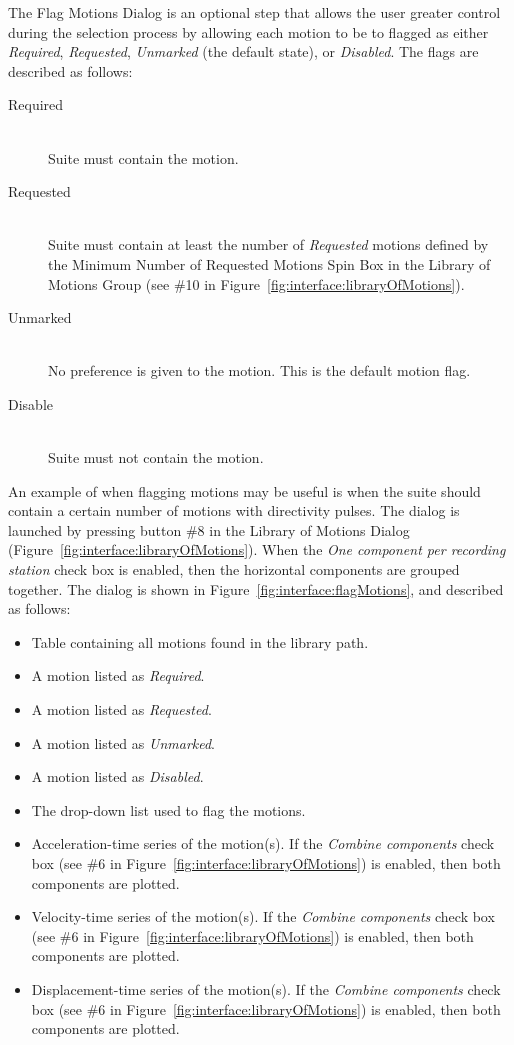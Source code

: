 \documentclass[11pt]{article}
\begin{document}
The Flag Motions Dialog is an optional step that allows the user greater
control during the selection process by allowing each motion to be to flagged as
either \emph{Required}, \emph{Requested}, \emph{Unmarked} (the default state), or
\emph{Disabled}. The flags are described as follows:
\begin{description}
  \item[Required] \hfill \\
    Suite must contain the motion.
  \item[Requested] \hfill \\
    Suite must contain at least the number of \emph{Requested} motions defined
    by the Minimum Number of Requested Motions Spin Box in the Library of
    Motions Group (see \#10 in Figure~\ref{fig:interface:libraryOfMotions}).
  \item[Unmarked] \hfill \\
    No preference is given to the motion. This is the default motion flag.
  \item[Disable] \hfill \\
    Suite must not contain the motion.
\end{description}
An example of when flagging motions may be useful is when the suite should
contain a certain number of motions with directivity pulses.  The dialog is
launched by pressing button \#8 in the Library of Motions Dialog
(Figure~\ref{fig:interface:libraryOfMotions}). When the
\emph{One component per recording station} check box is enabled, then the
horizontal components are grouped together. The dialog is shown in
Figure~\ref{fig:interface:flagMotions}, and described as follows:
\begin{itemize}
  \item Table containing all motions found in the library path.
  \item A motion listed as \emph{Required}.
  \item A motion listed as \emph{Requested}.
  \item A motion listed as \emph{Unmarked}.
  \item A motion listed as \emph{Disabled}.
  \item The drop-down list used to flag the motions.
  \item Acceleration-time series of the motion(s). If the \emph{Combine
	components} check box (see \#6 in
	Figure~\ref{fig:interface:libraryOfMotions}) is enabled, then both
	components are plotted.
  \item Velocity-time series of the motion(s). If the \emph{Combine components}
	check box (see \#6 in Figure~\ref{fig:interface:libraryOfMotions}) is
	enabled, then both components are plotted.
  \item Displacement-time series of the motion(s). If the \emph{Combine
	components} check box (see \#6 in
	Figure~\ref{fig:interface:libraryOfMotions}) is enabled, then both
	components are plotted.
\end{itemize}
\end{document}
